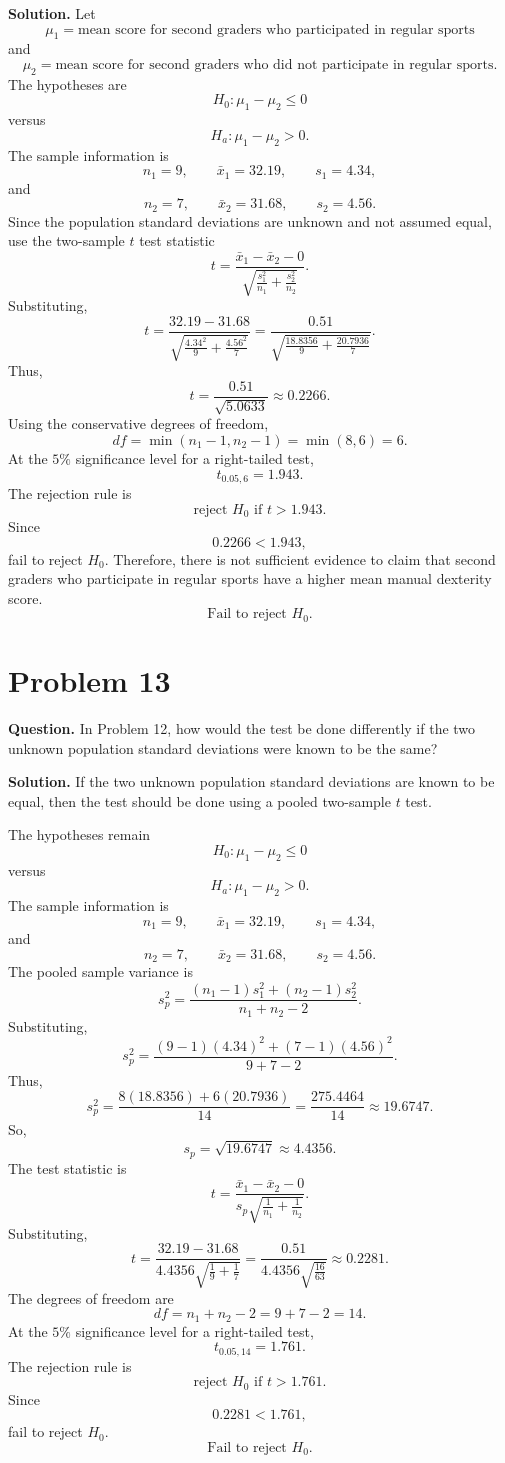 \documentclass[11pt]{article}
\begin{document}
\textbf{Solution.} Let
\[
\mu_1=\text{mean score for second graders who participated in regular sports}
\]
and
\[
\mu_2=\text{mean score for second graders who did not participate in regular sports}.
\]
The hypotheses are
\[
H_0:\mu_1-\mu_2\le 0
\]
versus
\[
H_a:\mu_1-\mu_2>0.
\]
The sample information is
\[
n_1=9,\qquad \bar x_1=32.19,\qquad s_1=4.34,
\]
and
\[
n_2=7,\qquad \bar x_2=31.68,\qquad s_2=4.56.
\]
Since the population standard deviations are unknown and not assumed equal, use the two-sample $t$ test statistic
\[
t=\frac{\bar x_1-\bar x_2-0}{\sqrt{\frac{s_1^2}{n_1}+\frac{s_2^2}{n_2}}}.
\]
Substituting,
\[
t=\frac{32.19-31.68}{\sqrt{\frac{4.34^2}{9}+\frac{4.56^2}{7}}}
=\frac{0.51}{\sqrt{\frac{18.8356}{9}+\frac{20.7936}{7}}}.
\]
Thus,
\[
t=\frac{0.51}{\sqrt{5.0633}}\approx 0.2266.
\]
Using the conservative degrees of freedom,
\[
df=\min(n_1-1,n_2-1)=\min(8,6)=6.
\]
At the $5\%$ significance level for a right-tailed test,
\[
t_{0.05,6}=1.943.
\]
The rejection rule is
\[
\text{reject }H_0\text{ if }t>1.943.
\]
Since
\[
0.2266<1.943,
\]
fail to reject $H_0$. Therefore, there is not sufficient evidence to claim that second graders who participate in regular sports have a higher mean manual dexterity score.
\[
\boxed{\text{Fail to reject }H_0.}
\]

\newpage
\section*{Problem 13}

\textbf{Question.} In Problem 12, how would the test be done differently if the two unknown population standard deviations were known to be the same?

\textbf{Solution.} If the two unknown population standard deviations are known to be equal, then the test should be done using a pooled two-sample $t$ test.

The hypotheses remain
\[
H_0:\mu_1-\mu_2\le 0
\]
versus
\[
H_a:\mu_1-\mu_2>0.
\]
The sample information is
\[
n_1=9,\qquad \bar x_1=32.19,\qquad s_1=4.34,
\]
and
\[
n_2=7,\qquad \bar x_2=31.68,\qquad s_2=4.56.
\]
The pooled sample variance is
\[
s_p^2=\frac{(n_1-1)s_1^2+(n_2-1)s_2^2}{n_1+n_2-2}.
\]
Substituting,
\[
s_p^2=\frac{(9-1)(4.34)^2+(7-1)(4.56)^2}{9+7-2}.
\]
Thus,
\[
s_p^2=\frac{8(18.8356)+6(20.7936)}{14}=\frac{275.4464}{14}\approx 19.6747.
\]
So,
\[
s_p=\sqrt{19.6747}\approx 4.4356.
\]
The test statistic is
\[
t=\frac{\bar x_1-\bar x_2-0}{s_p\sqrt{\frac{1}{n_1}+\frac{1}{n_2}}}.
\]
Substituting,
\[
t=\frac{32.19-31.68}{4.4356\sqrt{\frac{1}{9}+\frac{1}{7}}}
=\frac{0.51}{4.4356\sqrt{\frac{16}{63}}}\approx 0.2281.
\]
The degrees of freedom are
\[
df=n_1+n_2-2=9+7-2=14.
\]
At the $5\%$ significance level for a right-tailed test,
\[
t_{0.05,14}=1.761.
\]
The rejection rule is
\[
\text{reject }H_0\text{ if }t>1.761.
\]
Since
\[
0.2281<1.761,
\]
fail to reject $H_0$.
\[
\boxed{\text{Fail to reject }H_0.}
\]
\end{document}
